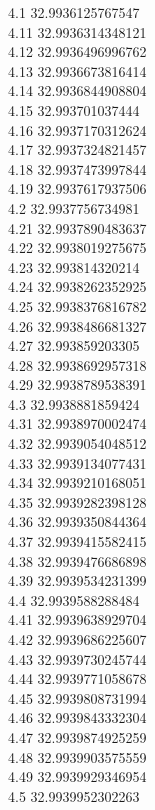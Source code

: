 {4.1	32.9936125767547\\
4.11	32.9936314348121\\
4.12	32.9936496996762\\
4.13	32.9936673816414\\
4.14	32.9936844908804\\
4.15	32.993701037444\\
4.16	32.9937170312624\\
4.17	32.9937324821457\\
4.18	32.9937473997844\\
4.19	32.9937617937506\\
4.2	32.9937756734981\\
4.21	32.9937890483637\\
4.22	32.9938019275675\\
4.23	32.993814320214\\
4.24	32.9938262352925\\
4.25	32.9938376816782\\
4.26	32.9938486681327\\
4.27	32.993859203305\\
4.28	32.9938692957318\\
4.29	32.9938789538391\\
4.3	32.9938881859424\\
4.31	32.9938970002474\\
4.32	32.9939054048512\\
4.33	32.9939134077431\\
4.34	32.9939210168051\\
4.35	32.9939282398128\\
4.36	32.9939350844364\\
4.37	32.9939415582415\\
4.38	32.9939476686898\\
4.39	32.9939534231399\\
4.4	32.9939588288484\\
4.41	32.9939638929704\\
4.42	32.9939686225607\\
4.43	32.9939730245744\\
4.44	32.9939771058678\\
4.45	32.9939808731994\\
4.46	32.9939843332304\\
4.47	32.9939874925259\\
4.48	32.9939903575559\\
4.49	32.9939929346954\\
4.5	32.9939952302263\\
}
